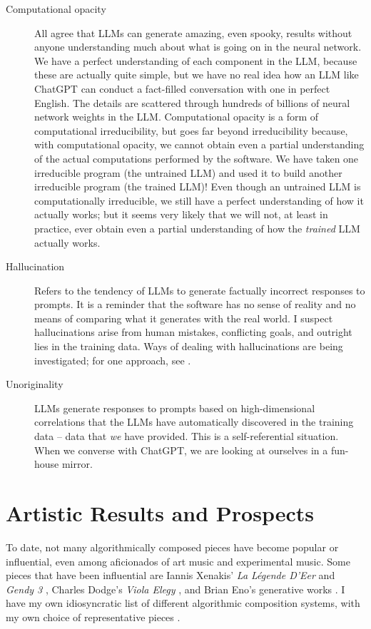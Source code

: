 \documentclass[11pt,papersize=a4]{scrartcl}
\begin{document}
\begin{description}
\item[Computational opacity] All agree that LLMs can generate amazing, even spooky, results without anyone understanding much about what is going on in the neural network. We have a perfect understanding of each component in the LLM, because these are actually quite simple, but we have no real idea how an LLM like ChatGPT can conduct a fact-filled conversation with one in perfect English. The details are scattered through hundreds of billions of neural network weights in the LLM. Computational opacity is a form of computational irreducibility, but goes far beyond irreducibility because, with computational opacity, we cannot obtain even a partial understanding of the actual computations performed by the software. We have taken one irreducible program (the untrained LLM) and used it to build another irreducible program (the trained LLM)! Even though an untrained LLM is computationally irreducible, we still have a perfect understanding of how it actually works; but it seems very likely that we will not, at least in practice, ever obtain even a partial understanding of how the \emph{trained} LLM actually works.
\item [Hallucination] Refers to the tendency of LLMs to generate factually incorrect responses to prompts. It is a reminder that the software has no sense of reality and no means of comparing what it generates with the real world. I suspect hallucinations arise from human mistakes, conflicting goals, and outright lies in the training data. Ways of dealing with hallucinations are being investigated; for one approach, see \parencite{christiano2017deep}.
\item [Unoriginality] LLMs generate responses to prompts based on high-dimensional correlations that the LLMs have automatically discovered in the training data -- data that \emph{we} have provided. This is a self-referential situation. When we converse with ChatGPT, we are looking at ourselves in a fun-house mirror.
\end{description}

\section*{Artistic Results and Prospects}

To date, not many algorithmically composed pieces have become popular or influential, even among aficionados of art music and experimental music. Some pieces that have been influential are Iannis Xenakis' \emph{La Légende D'Eer} \parencite{Solr-8143160} and \emph{Gendy 3} \parencite{gendy3},  Charles Dodge's \emph{Viola Elegy} \parencite{violaelegy}, and Brian Eno's generative works \parencite{eno1996generative, enochilvers}. I have my own idiosyncratic list of different algorithmic composition systems, with my own choice of representative pieces \parencite{rant}.
\end{document}
